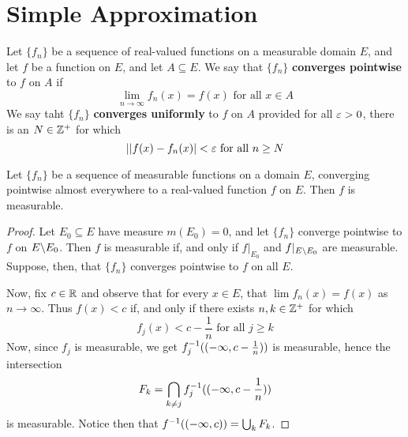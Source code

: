 \section{Simple Approximation}

\begin{definition}
    Let $\{f_n\}$ be a sequence of real-valued functions on a measurable domain
    $E$, and let  $f$ be a function on  $E$, and let  $A \subseteq E$. We say
    that $\{f_n\}$ \textbf{converges pointwise} to $f$ on  $A$ if
    \begin{equation*}
        \lim_{n \xrightarrow{} \infty}{f_n(x)}=f(x) \text{ for all } x \in A
    \end{equation*}
    We say taht $\{f_n\}$ \textbf{converges uniformly} to $f$ on  $A$ provided
    for all $\varepsilon>0$, there is an  $N \in \mathbb{Z}^+$ for which
    \begin{equation*}
        ||f(x)-f_n(x)|<\varepsilon \text{ for all } n \geq N
    \end{equation*}
\end{definition}

\begin{lemma}\label{9.2.1}
    Let $\{f_n\}$ be a sequence of measurable functions on a domain $E$,
    converging pointwise almost everywhere to a real-valued function  $f$ on $E$.
    Then  $f$ is measurable.
\end{lemma}
\begin{proof}
    Let $E_0 \subseteq E$ have measure $m(E_0)=0$, and let $\{f_n\}$ converge
    pointwise to $f$ on  $E \backslash E_0$. Then $f$ is measurable if, and only if
    $f|_{E_0}$ and $f|_{E \backslash E_0}$ are measurable. Suppose, then, that
    $\{f_n\}$ converges pointwise to $f$ on all  $E$.

    Now, fix $c \in \mathbb{R}$ and observe that for every  $x \in E$, that
    $\lim{f_n(x)}=f(x)$ as $n \xrightarrow{} \infty$. Thus  $f(x)<c$ if, and
    only if there exists $n,k \in \mathbb{Z}^+$ for which
    \begin{equation*}
        f_j(x)<c-\frac{1}{n} \text{ for all } j \geq k
    \end{equation*}
    Now, since $f_j$ is measurable, we get  $f_j^{-1}((-\infty,c-\frac{1}{n}))$
    is measurable, hence the intersection
    \begin{equation*}
        F_k=\bigcap_{k \neq j}{f_j^{-1}((-\infty,c-\frac{1}{n}))}
    \end{equation*}
    is measurable. Notice then that $f^{-1}((-\infty,c))=\bigcup_{k}{F_k}$.
\end{proof}

